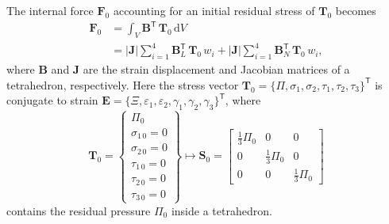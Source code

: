 The internal force $\boldsymbol{F}_0$ accounting for an initial residual stress of $\boldsymbol{T}_0$ becomes
\begin{subequations}
	\begin{align}
		\boldsymbol{F}_0 & = \int_{V} \mathbf{B}^{\mathsf{T}} \,	\boldsymbol{T}_0 \, 
		\mathrm{d} V \\
		& =  | \mathbf{J} | \sum_{i=1}^{4} \mathbf{B}_L^{\mathsf{T}} \,	\boldsymbol{T}_0 \, w_i + | \mathbf{J} | \sum_{i=1}^{4} \mathbf{B}_N^{\mathsf{T}} \, \boldsymbol{T}_0 \, w_i ,
	\end{align}
\end{subequations}
where $\mathbf{B}$ and $\mathbf{J}$ are the strain displacement and Jacobian matrices of a tetrahedron, respectively. 
Here the stress vector $\boldsymbol{T}_0 = \{ \Pi, \sigma_1, \sigma_2, \tau_1, \tau_2, \tau_3 \}^{\mathsf{T}}$ is conjugate to strain $\boldsymbol{E} = \{ \Xi, \varepsilon_1, \varepsilon_2, \gamma_1, \gamma_2, \gamma_3 \}^{\mathsf{T}}$, where 
\begin{equation}
\mathbf{T}_0 = \left\{ \begin{matrix}
    \Pi_0 \\ \sigma_{1\,0} \! = \! 0 \\ \sigma_{2\,0} \! = \! 0 \\
    \tau_{1\,0} \! = \! 0 \\ \tau_{2\,0} \! = \! 0 \\ \tau_{3\,0} \! = \! 0
\end{matrix} \right\} \mapsto \mathbf{S}_0 = \begin{bmatrix}
    \frac{1}{3} \Pi_0 & 0 & 0 \\
    0 & \frac{1}{3} \Pi_0 & 0 \\
    0 & 0 & \frac{1}{3} \Pi_0
\end{bmatrix}
\end{equation}
contains the residual pressure $\Pi_0$ inside a tetrahedron.
